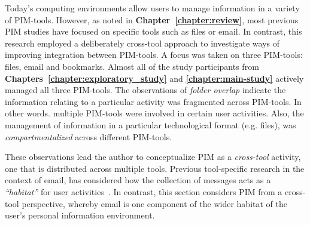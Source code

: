 
Today's computing environments allow users to manage information in a variety of PIM-tools.  However, as noted in \textbf{Chapter~\ref{chapter:review}}, most previous PIM studies have focused on specific tools such as files or email.  In contrast, this research employed a deliberately cross-tool approach to investigate ways of improving integration between PIM-tools.  A focus was taken on three PIM-tools: files, email and bookmarks.  Almost all of the study participants from \textbf{Chapters~\ref{chapter:exploratory_study}} and \textbf{\ref{chapter:main-study}} actively managed all three PIM-tools.  The observations of \textit{folder overlap} indicate the information relating to a particular activity was fragmented across PIM-tools.  In other words. multiple PIM-tools were involved in certain user activities.  Also, the management of information in a particular technological format (e.g. files), was \textit{compartmentalized} across different PIM-tools.

These observations lead the author to conceptualize PIM as a \textit{cross-tool} activity, one that is distributed across multiple tools.  Previous tool-specific research in the context of email, has considered how the collection of messages acts as a \textit{``habitat''} for user activities~\citep{Ducheneaut:01}.  In contrast, this section considers PIM from a cross-tool perspective, whereby email is one component of the wider habitat of the user's personal information environment. %

